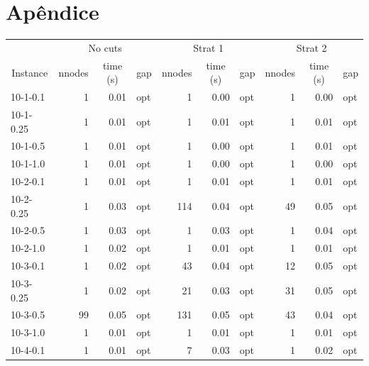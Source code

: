 \documentclass[11pt]{article}
\begin{document}
\section{Apêndice}
\label{sec:orgc5920a1}
\begin{table}[]
\begin{tabular}{lrrlrrlrrl}
          & \multicolumn{3}{c}{No cuts} & \multicolumn{3}{c}{Strat 1} & \multicolumn{3}{c}{Strat 2} \\
\multicolumn{1}{c}{Instance} &
  \multicolumn{1}{c}{nnodes} &
  \multicolumn{1}{c}{time (s)} &
  \multicolumn{1}{c}{gap} &
  \multicolumn{1}{c}{nnodes} &
  \multicolumn{1}{c}{time (s)} &
  \multicolumn{1}{c}{gap} &
  \multicolumn{1}{c}{nnodes} &
  \multicolumn{1}{c}{time (s)} &
  \multicolumn{1}{c}{gap} \\
10-1-0.1  & 1      & 0.01     & opt     & 1       & 0.00     & opt    & 1      & 0.00     & opt     \\
10-1-0.25 & 1      & 0.01     & opt     & 1       & 0.01     & opt    & 1      & 0.01     & opt     \\
10-1-0.5  & 1      & 0.01     & opt     & 1       & 0.00     & opt    & 1      & 0.01     & opt     \\
10-1-1.0  & 1      & 0.01     & opt     & 1       & 0.00     & opt    & 1      & 0.00     & opt     \\
10-2-0.1  & 1      & 0.01     & opt     & 1       & 0.01     & opt    & 1      & 0.01     & opt     \\
10-2-0.25 & 1      & 0.03     & opt     & 114     & 0.04     & opt    & 49     & 0.05     & opt     \\
10-2-0.5  & 1      & 0.03     & opt     & 1       & 0.03     & opt    & 1      & 0.04     & opt     \\
10-2-1.0  & 1      & 0.02     & opt     & 1       & 0.01     & opt    & 1      & 0.01     & opt     \\
10-3-0.1  & 1      & 0.02     & opt     & 43      & 0.04     & opt    & 12     & 0.05     & opt     \\
10-3-0.25 & 1      & 0.02     & opt     & 21      & 0.03     & opt    & 31     & 0.05     & opt     \\
10-3-0.5  & 99     & 0.05     & opt     & 131     & 0.05     & opt    & 43     & 0.04     & opt     \\
10-3-1.0  & 1      & 0.01     & opt     & 1       & 0.01     & opt    & 1      & 0.01     & opt     \\
10-4-0.1  & 1      & 0.01     & opt     & 7       & 0.03     & opt    & 1      & 0.02     & opt     \\

\end{tabular}
\end{table}
\end{document}
